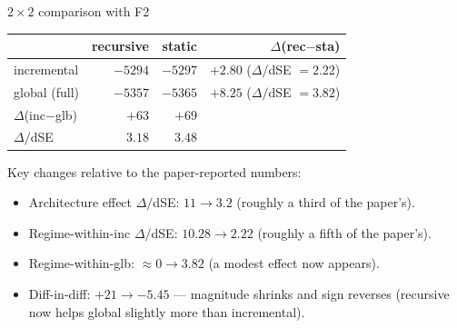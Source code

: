 \documentclass[10pt,aspectratio=169]{beamer}
\newcommand{\emp}[1]{\textcolor{CSP-emphasis}{\textbf{#1}}}
\begin{document}
\begin{frame}{$2\!\times\!2$ comparison with F2}
\begin{center}
\begin{tabular}{l|rr|r}
\toprule
             & recursive & static & $\Delta$(rec$-$sta) \\
\midrule
incremental  & $-5294$ & $-5297$ & $+2.80$ ($\Delta/$dSE $= 2.22$) \\
global (full)& $-5357$ & $-5365$ & $+8.25$ ($\Delta/$dSE $= 3.82$) \\
\midrule
$\Delta$(inc$-$glb) & $+63$ & $+69$ & \\
$\Delta/$dSE        & \emp{$3.18$} & \emp{$3.48$} & \\
\bottomrule
\end{tabular}
\end{center}

\vspace{0.8em}
Key changes relative to the paper-reported numbers:
\begin{itemize}\itemsep0.2em
  \item Architecture effect $\Delta/$dSE: $11 \to 3.2$ (roughly a third of the paper's).
  \item Regime-within-inc $\Delta/$dSE: $10.28 \to 2.22$ (roughly a fifth of the paper's).
  \item Regime-within-glb: $\approx 0 \to 3.82$ (a modest effect now appears).
  \item Diff-in-diff: $+21 \to -5.45$ --- magnitude shrinks and sign reverses (recursive now helps global slightly more than incremental).
\end{itemize}
\end{frame}
\end{document}
